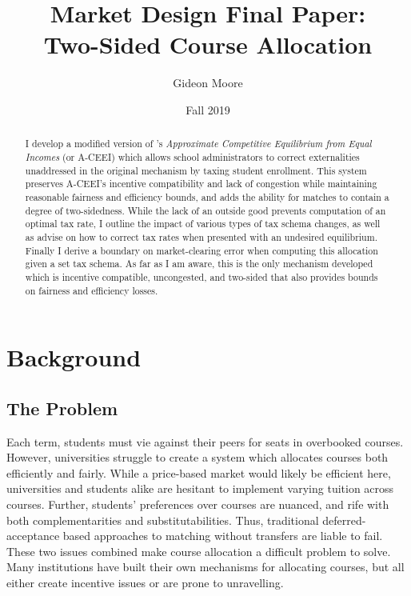 \documentclass{article}
\title{Market Design Final Paper:\\Two-Sided Course Allocation}
\author{Gideon Moore}
\date{Fall 2019}
\begin{document}
\maketitle

\begin{abstract}
I develop a modified version of \textcite{budish2011}'s \emph{Approximate Competitive Equilibrium from Equal Incomes} (or A-CEEI) which allows school administrators to correct externalities unaddressed in the original mechanism by taxing student enrollment. This system preserves A-CEEI's incentive compatibility and lack of congestion while maintaining reasonable fairness and efficiency bounds, and adds the ability for matches to contain a degree of two-sidedness. While the lack of an outside good prevents computation of an optimal tax rate, I outline the impact of various types of tax schema changes, as well as advise on how to correct tax rates when presented with an undesired equilibrium. Finally I derive a boundary on market-clearing error when computing this allocation given a set tax schema. As far as I am aware, this is the only mechanism developed which is incentive compatible, uncongested, and two-sided that also provides bounds on fairness and efficiency losses.
\end{abstract}

\section{Background}

\subsection{The Problem}
Each term, students must vie against their peers for seats in overbooked courses. However, universities struggle to create a system which allocates courses both efficiently and fairly. While a price-based market would likely be efficient here, universities and students alike are hesitant to implement varying tuition across courses. Further, students' preferences over courses are nuanced, and rife with both complementarities and substitutabilities. Thus, traditional deferred-acceptance based approaches to matching without transfers are liable to fail. These two issues combined make course allocation a difficult problem to solve. Many institutions have built their own mechanisms for allocating courses, but all either create incentive issues or are prone to unravelling.
\end{document}
